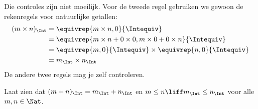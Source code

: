 \documentclass[openany]{memoir}
\begin{document}
Die controles zijn niet moeilijk. Voor de tweede regel gebruiken we
gewoon de rekenregels voor natuurlijke getallen:
	\begin{align*}
		(m \times n)_\Int  &= \equivrep{m \times n, 0}{\Intequiv} \\
		&= \equivrep{m \times n + 0 \times 0, m \times 0 + 0 \times n}{\Intequiv} \\
		&= \equivrep{m, 0}{\Intequiv} \times \equivrep{n, 0}{\Intequiv} \\
		&= m_\Int \times n_\Int
	\end{align*}
De andere twee regels mag je zelf controleren.
\begin{prob}
	Laat zien dat $(m + n)_\Int = m_\Int + n_\Int$ en $m \leq n \liff
	m_\Int \leq n_\Int$ voor alle $m, n \in \Nat$.
\end{prob}
\endgroup

\begingroup
\def\olfilename{OLP-0043}
\def\olfilepath{content/sets-functions-relations/arithmetization/}
\hypertarget{unit-OLP-0043}{}
\end{document}
